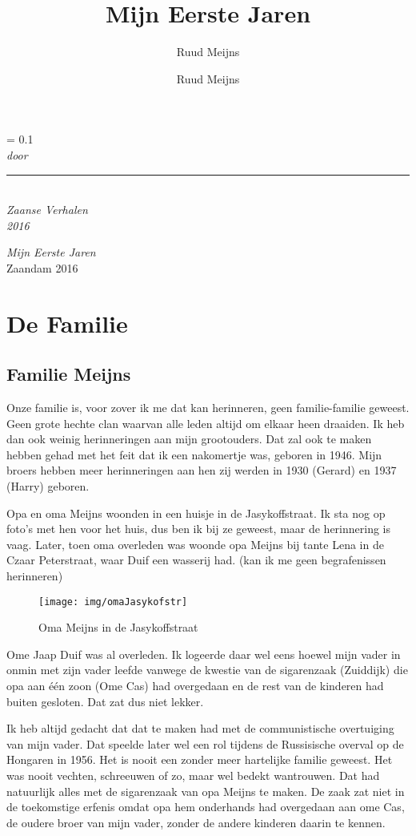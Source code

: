 \documentclass[10pt,twoside,openright]{memoir}
\author{Ruud Meijns}
\author{Ruud Meijns}
\title{Mijn Eerste Jaren}
\date{}
\newlength{\drop}%
\newcommand*{\titleS}{\begingroup%
\drop = 0.1\textheight
\centering
\vspace*{\drop}
{\Huge \thetitle}\\[\baselineskip]
{\large\itshape door \theauthor}\\[\baselineskip]
\vfill
\rule{0.4\textwidth}{0.4pt}\\[\baselineskip]
{\large\itshape Zaanse Verhalen \\[0.5cm] 2016}\par
\vspace*{\drop}
\endgroup}
\begin{document}
\pagestyle{plain}
\let\cleardoublepage\clearpage
\thispagestyle{empty}
\titleS




\frontmatter

\null\vfill
\thispagestyle{empty}
\begin{flushleft}
\textit{Mijn Eerste Jaren}\\
\vfil
Zaandam 
2016


\end{flushleft}
\let\cleardoublepage\clearpage
\clearpage
\tableofcontents
\thispagestyle{empty}
\clearpage

\mainmatter
\sloppy

\part{De Familie}
\thispagestyle{empty}
\chapter{Familie Meijns} %
\label{cha:familie_meijns}

Onze familie is, voor zover ik me dat kan herinneren, geen familie-familie geweest. Geen grote hechte clan waarvan alle leden altijd om elkaar heen draaiden. Ik heb dan ook weinig herinneringen aan mijn grootouders. Dat zal ook te maken hebben gehad met het feit dat ik een nakomertje was, geboren in 1946. Mijn broers hebben meer herinneringen aan hen zij werden in 1930 (Gerard) en 1937 (Harry) geboren. 

Opa en oma Meijns woonden in een huisje in de Jasykoffstraat. Ik sta nog op foto’s met hen voor het huis, dus ben ik bij ze geweest, maar de herinnering is vaag. Later, toen oma overleden was woonde opa Meijns bij tante Lena in de Czaar Peterstraat, waar Duif een wasserij had. (kan ik me geen begrafenissen herinneren)

\begin{figure}[t]
\texttt{[image: img/omaJasykofstr]}
\caption{Oma Meijns in de Jasykoffstraat}
\end{figure}

Ome Jaap Duif was al overleden. Ik logeerde daar wel eens hoewel mijn vader in onmin met zijn vader leefde vanwege de kwestie van de sigarenzaak (Zuiddijk) die opa aan één zoon (Ome Cas) had overgedaan en de rest van de kinderen had buiten gesloten. Dat zat dus niet lekker. 

Ik heb altijd gedacht dat dat te maken had met de communistische overtuiging van mijn vader. Dat speelde later wel een rol tijdens de Russisische overval op de Hongaren in 1956. Het is nooit een zonder meer hartelijke familie geweest. Het was nooit vechten, schreeuwen of zo, maar wel bedekt wantrouwen. Dat had natuurlijk alles met de sigarenzaak van opa Meijns te maken. De zaak zat niet in de toekomstige erfenis omdat opa hem onderhands had overgedaan aan ome Cas, de oudere broer van mijn vader, zonder de andere kinderen daarin te kennen. 
\end{document}
